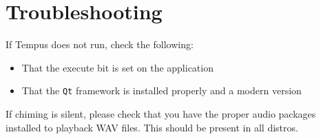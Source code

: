 \section{Troubleshooting}

If Tempus does not run, check the following:
\begin{itemize}
    \item That the execute bit is set on the application
    \item That the \texttt{Qt} framework is installed properly and a modern version
\end{itemize}

If chiming is silent, please check that you have the proper audio packages installed to playback WAV files. This should be present in all distros.
